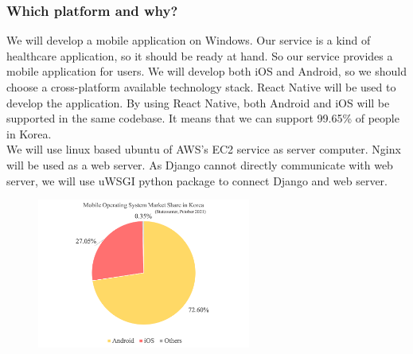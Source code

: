 \documentclass[conference]{IEEEtran}
\begin{document}
\subsubsection{Which platform and why?}
We will develop a mobile application on Windows. Our service is a kind of healthcare application, so it should be ready at hand. So our service provides a mobile application for users. We will develop both iOS and Android, so we should choose a cross-platform available technology stack. React Native will be used to develop the application. By using React Native, both Android and iOS will be supported in the same codebase. It means that we can support 99.65\% of people in Korea. \\
We will use linux based ubuntu of AWS's EC2 service as server computer. Nginx will be used as a web server. As Django cannot directly communicate with web server, we will use uWSGI python package to connect Django and web server. 


\begin{figure}[h!]
\centering
\includegraphics[width=7cm]{imagefolder/1.png}
\caption{}
\label{fig:map}
\end{figure}
\end{document}
